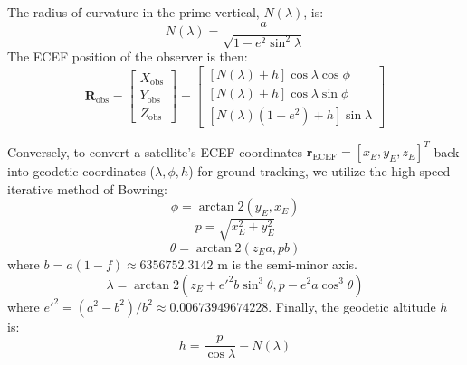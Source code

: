 \documentclass[11pt,journal,onecolumn]{IEEEtran}
\begin{document}
The radius of curvature in the prime vertical, $N(\lambda)$, is:
\begin{equation}
N(\lambda) = \frac{a}{\sqrt{1 - e^2 \sin^2\lambda}}
\label{eq:prime_vertical}
\end{equation}
The ECEF position of the observer is then:
\begin{equation}
\mathbf{R}_{\text{obs}} = \begin{bmatrix}
X_{\text{obs}} \\
Y_{\text{obs}} \\
Z_{\text{obs}}
\end{bmatrix} = \begin{bmatrix}
[N(\lambda) + h] \cos\lambda \cos\phi \\
[N(\lambda) + h] \cos\lambda \sin\phi \\
[N(\lambda)(1 - e^2) + h] \sin\lambda
\end{bmatrix}
\label{eq:observer_ecef}
\end{equation}

Conversely, to convert a satellite's ECEF coordinates $\mathbf{r}_{\text{ECEF}} = [x_E, y_E, z_E]^T$ back into geodetic coordinates ($\lambda, \phi, h$) for ground tracking, we utilize the high-speed iterative method of Bowring:
\begin{equation}
\phi = \arctan2(y_E, x_E)
\label{eq:bowring_lon}
\end{equation}
\begin{equation}
p = \sqrt{x_E^2 + y_E^2}
\label{eq:bowring_p}
\end{equation}
\begin{equation}
\theta = \arctan2(z_E a, p b)
\label{eq:bowring_theta}
\end{equation}
where $b = a(1-f) \approx 6356752.3142\text{ m}$ is the semi-minor axis.
\begin{equation}
\lambda = \arctan2\left( z_E + e'^2 b \sin^3\theta, p - e^2 a \cos^3\theta \right)
\label{eq:bowring_lat}
\end{equation}
where $e'^2 = (a^2 - b^2)/b^2 \approx 0.00673949674228$. Finally, the geodetic altitude $h$ is:
\begin{equation}
h = \frac{p}{\cos\lambda} - N(\lambda)
\label{eq:bowring_alt}
\end{equation}
\end{document}

